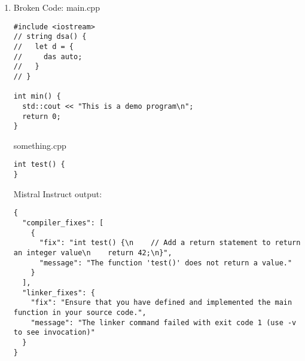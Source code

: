 \documentclass{article}
\begin{document}
\begin{enumerate}
			\item
			Broken Code:
			main.cpp
			\begin{verbatim}
#include <iostream>
// string dsa() {
//   let d = {
//     das auto;
//   }
// }

int min() {
  std::cout << "This is a demo program\n";
  return 0;
}
			\end{verbatim}
			something.cpp
			\begin{verbatim}
int test() {
}
			\end{verbatim}
			Mistral Instruct output:
			\begin{verbatim}
{
  "compiler_fixes": [
    {
      "fix": "int test() {\n    // Add a return statement to return an integer value\n    return 42;\n}",
      "message": "The function 'test()' does not return a value."
    }
  ],
  "linker_fixes": {
    "fix": "Ensure that you have defined and implemented the main function in your source code.",
    "message": "The linker command failed with exit code 1 (use -v to see invocation)"
  }
}
			\end{verbatim}
		\end{enumerate}
\end{document}
